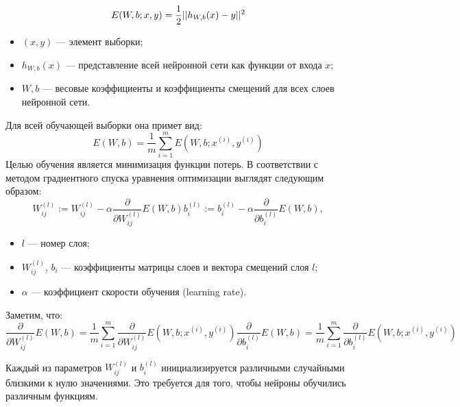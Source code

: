 \documentclass[14pt, a4paper]{extarticle}
\DeclarePairedDelimiter{\norm}{\lvert\lvert}{\rvert\lvert}
\begin{document}
\begin{equation*}
	E(W, b; x, y) = \frac{1}{2} \norm{h_{W,b}(x)-y}^2
\end{equation*}
\begin{itemize}
	\item $(x, y)$ — элемент выборки;
	\item $h_{W,b}(x)$ — представление всей нейронной сети как функции от входа $x$;
	\item $W, b$ — весовые коэффициенты и коэффициенты смещений для всех слоев нейронной сети.
\end{itemize}
Для всей обучающей выборки она примет вид:
\begin{equation*}
	E(W, b) = \frac{1}{m} \sum^{m}_{i=1} E(W, b; x^{(i)}, y^{(i)})
\end{equation*}
Целью обучения является минимизация функции потерь. В соответствии с методом градиентного спуска уравнения оптимизации выглядят следующим образом:
\begin{subequations}
\begin{equation*}
	W^{(l)}_{ij} := W^{(l)}_{ij} - \alpha \frac{\partial}{\partial W^{(l)}_{ij}} E(W, b)
\end{equation*}
\begin{equation*}
	b^{(l)}_i := b^{(l)}_i- \alpha \frac{\partial}{\partial b^{(l)}_i} E(W, b),
\end{equation*}
\end{subequations}
\begin{itemize}
	\item $l$ — номер слоя;
	\item $W^{(l)}_{ij}$, $b_i$ — коэффициенты матрицы слоев и вектора смещений слоя $l$;
	\item $\alpha$ — коэффициент скорости обучения (learning rate).
\end{itemize}
Заметим, что:
\begin{subequations}
\begin{equation*}
	\frac{\partial}{\partial W^{(l)}_{ij}} E(W, b) = \frac{1}{m} \sum^m_{i=1} \frac{\partial}{\partial W^{(l)}_{ij}} E(W, b; x^{(i)}, y^{(i)})
\end{equation*}
\begin{equation*}
	\frac{\partial}{\partial b^{(l)}_i} E(W, b) = \frac{1}{m} \sum^m_{i=1} \frac{\partial}{\partial b^{(l)}_i} E(W, b; x^{(i)}, y^{(i)})
\end{equation*}
\end{subequations}

Каждый из параметров $W^{(l)}_{ij}$ и $b^{(l)}_i$ инициализируется различными случайными близкими к нулю значениями. Это требуется для того, чтобы нейроны обучились различным функциям.
\end{document}

